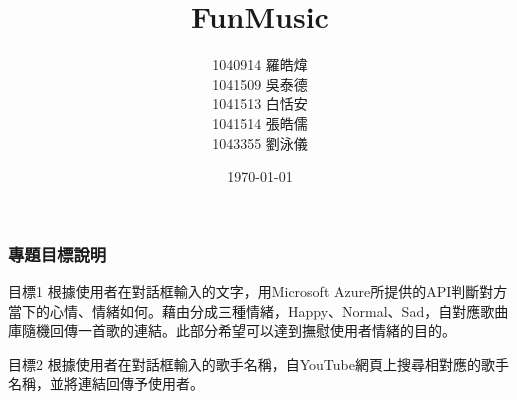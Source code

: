 \documentclass{beamer}
\title[Short title]{FunMusic} %
\author{
1040914 羅皓煒\\
1041509 吳泰德\\
1041513 白恬安\\
1041514 張皓儒\\ 
1043355 劉泳儀\\} %
\institute[UCLA] %
{
\large 元智大學-開放平台軟體課程\\ %
\medskip
}
\date{\today} %
\begin{document}
\begin{CJK}{UTF8}{<font>} 
\begin{frame}
\titlepage %
\end{frame}


\begin{frame}

\frametitle{專題目標說明} %
\begin{block}{目標1}
根據使用者在對話框輸入的文字，用Microsoft Azure所提供的API判斷對方當下的心情、情緒如何。藉由分成三種情緒，Happy、Normal、Sad，自對應歌曲庫隨機回傳一首歌的連結。此部分希望可以達到撫慰使用者情緒的目的。
\end{block}

\begin{block}{目標2}
根據使用者在對話框輸入的歌手名稱，自YouTube網頁上搜尋相對應的歌手名稱，並將連結回傳予使用者。
\end{block}
\end{frame}






\end{CJK}
\end{document}
